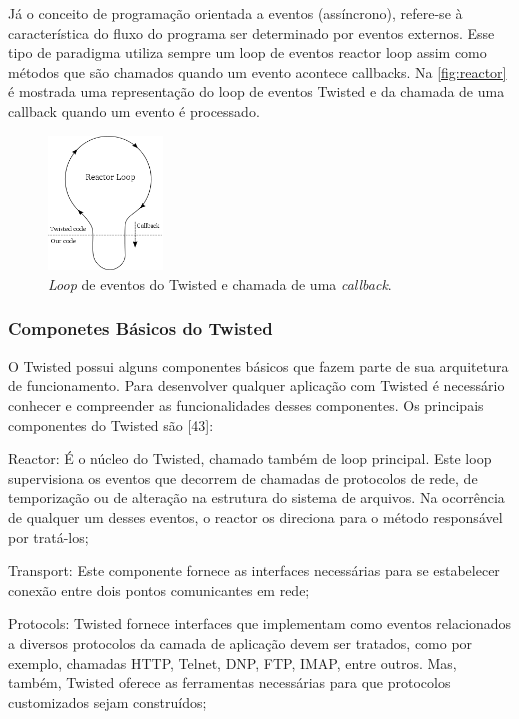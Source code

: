 \documentclass[journal]{IEEEtran}
\begin{document}
Já o conceito de programação orientada a eventos (assíncrono), refere-se à característica do fluxo do programa ser determinado por eventos externos. Esse tipo de paradigma utiliza sempre um loop de eventos reactor loop assim como métodos que são chamados quando um evento acontece callbacks.  Na \autoref{fig:reactor} é mostrada uma representação do loop de eventos Twisted e da chamada de uma callback quando um evento é processado.

\begin{figure}[htb]
    \centering
    \includegraphics[width=1.2in]{Figuras/reactor-callback.png}
    \caption{\label{fig:reactor} \textit{Loop} de eventos do Twisted e chamada de uma \textit{callback}.}
\end{figure}

\subsubsection{Componetes Básicos do Twisted}

O Twisted possui alguns componentes básicos que fazem parte de sua arquitetura de funcionamento. Para desenvolver qualquer aplicação com Twisted é necessário conhecer e compreender as funcionalidades desses componentes. Os principais componentes do Twisted são [43]:

Reactor: É o núcleo do Twisted, chamado também de loop principal. Este loop supervisiona os eventos que decorrem de chamadas de protocolos de rede, de temporização ou de alteração na estrutura do sistema de arquivos. Na ocorrência de qualquer um desses eventos, o reactor os direciona para o método responsável por tratá-los;

Transport: Este componente fornece as interfaces necessárias para se estabelecer conexão entre dois pontos comunicantes em rede;

Protocols: Twisted fornece interfaces que implementam como eventos relacionados a diversos protocolos da camada de aplicação devem ser tratados, como por exemplo, chamadas HTTP, Telnet, DNP, FTP, IMAP, entre outros. Mas, também, Twisted oferece as ferramentas necessárias para que protocolos customizados sejam construídos;
\end{document}
